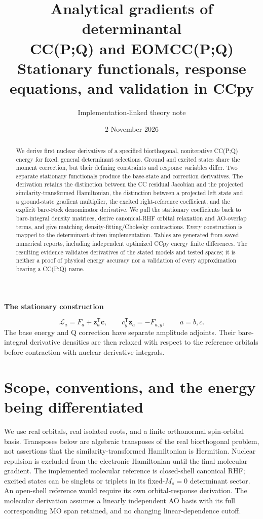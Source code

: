 \documentclass[11pt,letterpaper]{article}
\title{Analytical gradients of determinantal\\CC(P;Q) and EOMCC(P;Q)\\[4pt]
\large Stationary functionals, response equations, and validation in CCpy}
\author{Implementation-linked theory note}
\date{2 November 2026}
\numberwithin{equation}{section}
\newcommand{\T}{\mathsf T}
\begin{document}
\maketitle
\begin{abstract}
We derive first nuclear derivatives of a specified biorthogonal, noniterative
CC(P;Q) energy for fixed, general determinant selections. Ground and excited
states share the moment correction, but their defining constraints and
response variables differ. Two separate stationary functionals produce the
base-state and correction derivatives. The derivation retains the distinction
between the CC residual Jacobian and the projected similarity-transformed
Hamiltonian, the distinction between a projected left state and a ground-state
gradient multiplier, the excited right-reference coefficient, and the explicit
bare-Fock denominator derivative. We pull the stationary coefficients back to
bare-integral density matrices, derive canonical-RHF orbital relaxation and
AO-overlap terms, and give matching density-fitting/Cholesky contractions.
Every construction is mapped to the determinant-driven implementation. Tables
are generated from saved numerical reports, including independent optimized
CCpy energy finite differences. The resulting evidence validates derivatives
of the stated models and tested spaces; it is neither a proof of physical
energy accuracy nor a validation of every approximation bearing a CC(P;Q) name.
\end{abstract}
\bigskip
\begin{center}\textbf{The stationary construction}\end{center}
\[
 \boxed{\mathcal L_a=F_a+\mathbf z_a^{\T}\mathbf c,
 \qquad c_y^{\T}\mathbf z_a=-F_{a,y},\qquad a=b,c.}
\]
The base energy and Q correction have separate amplitude adjoints. Their
bare-integral derivative densities are then relaxed with respect to the
reference orbitals before contraction with nuclear derivative integrals.
\clearpage
{\small\setlength{\baselineskip}{10pt}\setlength{\parskip}{0pt}\tableofcontents}
\clearpage

\section{Scope, conventions, and the energy being differentiated}
\label{sec:definitions}
We use real orbitals, real isolated roots, and a finite orthonormal
spin-orbital basis. Transposes below are algebraic transposes of the real
biorthogonal problem, not assertions that the similarity-transformed
Hamiltonian is Hermitian. Nuclear repulsion is excluded from the electronic
Hamiltonian until the final molecular gradient. The implemented molecular
reference is closed-shell canonical RHF; excited states can be singlets or
triplets in its fixed-$M_s=0$ determinant sector. An open-shell reference
would require its own orbital-response derivation. The molecular derivation
assumes a linearly independent AO basis with its full corresponding MO span
retained, and no changing linear-dependence cutoff.
\end{document}
